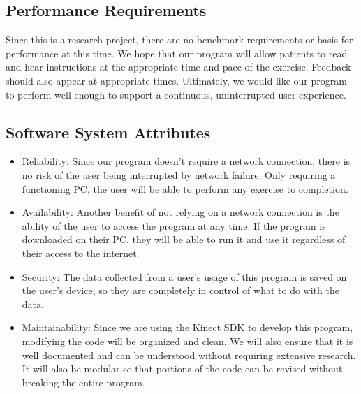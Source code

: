 \documentclass[onecolumn, draftclsnofoot,10pt, compsoc]{IEEEtran}
\begin{document}
\subsection{Performance Requirements}
Since this is a research project, there are no benchmark requirements or basis for performance at this time. We hope that our program will allow patients to read and hear instructions at the appropriate time and pace of the exercise. Feedback should also appear at appropriate times. Ultimately, we would like our program to perform well enough to support a continuous, uninterrupted user experience.

\subsection{Software System Attributes}
\begin{itemize}
\item Reliability:
Since our program doesn't require a network connection, there is no risk of the user being interrupted by network failure. Only requiring a functioning PC, the user will be able to perform any exercise to completion.
\item Availability:
Another benefit of not relying on a network connection is the ability of the user to access the program at any time. If the program is downloaded on their PC, they will be able to run it and use it regardless of their access to the internet.
\item Security:
The data collected from a user's usage of this program is saved on the user's device, so they are completely in control of what to do with the data. 
\item Maintainability:
Since we are using the Kinect SDK to develop this program, modifying the code will be organized and clean. We will also ensure that it is well documented and can be understood without requiring extensive research. It will also be modular so that portions of the code can be revised without breaking the entire program.
\end{itemize}
\end{document}

